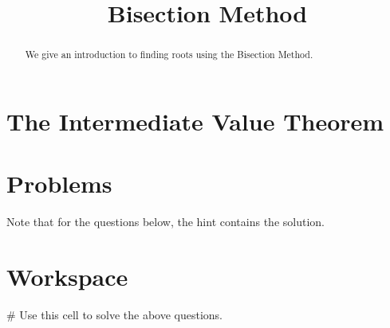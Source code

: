 \documentclass{ximera}
\title{Bisection Method}
\begin{document}
  
\begin{abstract}  
We give an introduction to finding roots using the Bisection Method.
\end{abstract}  
\maketitle

\section{The Intermediate Value Theorem}



\section{Problems}

Note that for the questions below, the hint contains the solution.

\begin{question}
\end{question}

\section{Workspace}

\begin{sageCell}
# Use this cell to solve the above questions.
\end{sageCell}
\end{document}
